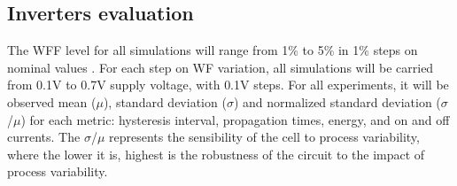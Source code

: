 \documentclass[pgmicro,mestrado,english]{iiufrgs}
\begin{document}
\begin{table}[]
\centering
\caption{Parameters applied in the electrical simulations}
\label{electPar}
\end{table}

\subsection{Inverters evaluation}
The WFF level for all simulations will range from 1\% to 5\% in 1\% steps on nominal values \cite{nawaz2014comparison}. For each step on WF variation, all simulations will be carried from 0.1V to 0.7V supply voltage, with 0.1V steps. For all experiments, it will be observed mean (\(\mu\)), standard deviation (\(\sigma\)) and normalized standard deviation (\(\sigma\)/\(\mu\)) for each metric: hysteresis interval, propagation times, energy, and on and off currents. The \(\sigma\)/\(\mu\) represents the sensibility of the cell to process variability, where the lower it is, highest is the robustness of the circuit to the impact of process variability.
\end{document}
